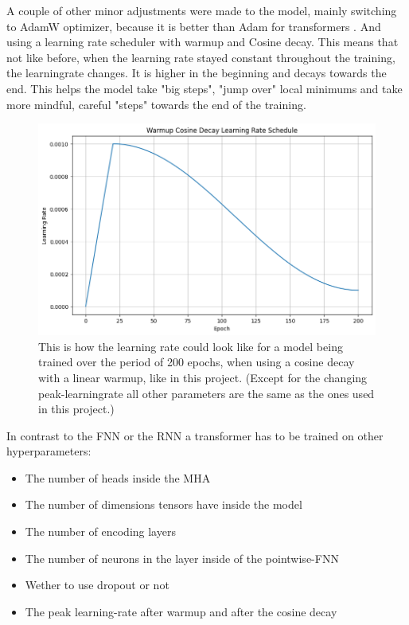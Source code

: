 \documentclass{article}
\begin{document}
A couple of other minor adjustments were made to the model, mainly switching to 
AdamW optimizer, because it is better than Adam for transformers \cite{loshchilov2019decoupledweightdecayregularization}. 
And using a learning rate scheduler with warmup and Cosine decay. This means 
that not like before, when the learning rate stayed constant throughout the 
training, the learningrate changes. It is higher in the beginning and decays 
towards the end. This helps the model take "big steps", "jump over" local 
minimums and take more mindful, careful "steps" towards the end of the training. 

\begin{figure}[htbp]
    \centering
    \includegraphics[width=0.5\paperwidth]{images/learningRate.png}
    \caption{This is how the learning rate could look like for a model being 
    trained over the period of 200 epochs, when using a cosine decay with a 
    linear warmup, like in this project. (Except for the changing 
    peak-learningrate all other parameters are the same as the ones used in 
    this project.)}
    \label{fig:learningrate}
\end{figure}

In contrast to the FNN or the RNN a transformer has to be trained on other 
hyperparameters: 
\begin{itemize}
    \item The number of heads inside the MHA
    \item The number of dimensions tensors have inside the model
    \item The number of encoding layers
    \item The number of neurons in the layer inside of the pointwise-FNN
    \item Wether to use dropout or not
    \item The peak learning-rate after warmup and after the cosine decay
\end{itemize}
\end{document}
